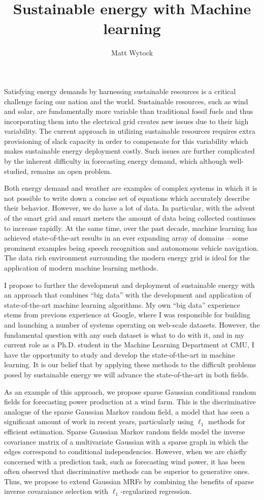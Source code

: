 \documentclass[12pt]{article}
\title{Sustainable energy with Machine learning}
\author{Matt Wytock}
\begin{document}
Satisfying energy demands by harnessing sustainable resources is a critical challenge facing our nation and the world. Sustainable resources, such as wind and solar, are fundamentally more variable than traditional fossil fuels and thus incorporating them into the electrical grid creates new issues due to their high variability. The current approach in utilizing sustainable resources requires extra provisioning of slack capacity in order to compensate for this variability which makes sustainable energy deployment costly. Such issues are further complicated by the inherent difficulty in forecasting energy demand, which although well-studied, remains an open problem. 

Both energy demand and weather are examples of complex systems in which it is not possible to write down a concise set of equations which accurately describe their behavior. However, we do have a lot of data. In particular, with the advent of the smart grid and smart meters the amount of data being collected continues to increase rapidly. At the same time, over the past decade, machine learning has achieved state-of-the-art results in an ever expanding array of domains -- some prominent examples being speech recognition and autonomous vehicle navigation. The data rich environment surrounding the modern energy grid is ideal for the application of modern machine learning methods.  

I propose to further the development and deployment of sustainable energy with an approach that combines ``big data'' with the development and application of state-of-the-art machine learning algorithms. My own ``big data'' experience stems from previous experience at Google, where I was responsible for building and launching a number of systems operating on web-scale datasets. However, the fundamental question with any such dataset is what to do with it, and in my current role as a Ph.D. student in the Machine Learning Department at CMU, I have the opportunity to study and develop the state-of-the-art in machine learning. It is our belief that by applying these methods to the difficult problems posed by sustainable energy we will advance the state-of-the-art in both fields.

As an example of this approach, we propose sparse Gaussian conditional random fields for forecasting power production at a wind farm. This is the discriminative analogue of the sparse Gaussian Markov random field, a model that has seen a significant amount of work in recent years, particularly using $\ell_1$ methods for efficient estimation. Sparse Gaussian Markov random fields model the inverse covariance matrix of a multivariate Gaussian with a sparse graph in which the edges correspond to conditional independencies. However, when we are chiefly concerned with a prediction task, such as forecasting wind power, it has been often observed that discriminative methods can be superior to generative ones. Thus, we propose to extend Gaussian MRFs by combining the benefits of sparse inverse covaraiance selection with $\ell_1$-regularized regression.
\end{document}
